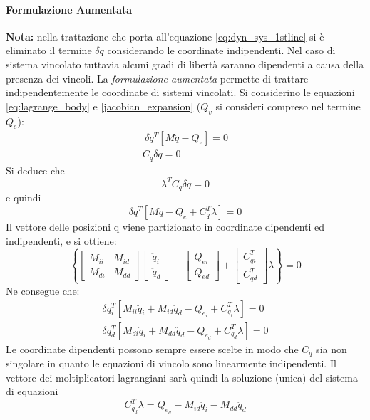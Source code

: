 \paragraph{Formulazione Aumentata}
\textbf{Nota:} nella trattazione che porta all'equazione \ref{eq:dyn_sys_1stline} si è eliminato il termine $\delta q$ considerando le coordinate indipendenti. Nel caso di sistema vincolato tuttavia alcuni gradi di libertà saranno dipendenti a causa della presenza dei vincoli. La \emph{formulazione aumentata} \cite{shabana94} permette di trattare indipendentemente le coordinate di sistemi vincolati. \newline
Si considerino le equazioni \ref{eq:lagrange_body} e \ref{jacobian_expansion} ($Q_v$ si consideri compreso nel termine $Q_e$):
\begin{align} \nonumber \ \delta q^T\left[ M\ddot{q} - Q_e \right] = 0 \\ \nonumber
C_q \delta q = 0
\end{align}
Si deduce che  \[ \lambda^T C_q \delta q = 0 \] e quindi 
\[\delta q^T\left[ M\ddot{q} - Q_e +C_q^T\lambda \right] = 0 \]
Il vettore delle posizioni q viene partizionato in coordinate dipendenti ed indipendenti, e si ottiene:
\begin{equation}  [\delta q_i^T \quad \delta q_d^T] \left\{ \begin{bmatrix} M_{ii} & M_{id} \\ M_{di} & M_{dd}\end{bmatrix}
\begin{bmatrix}\ddot{q}_i \\ \ddot{q}_d \end{bmatrix}
- \begin{bmatrix} Q_{ei} \\ Q_{ed} \end{bmatrix}+ \begin{bmatrix}
C_{qi}^T \\ C_{qd}^T\end{bmatrix} \lambda
\right\}   = 0 \end{equation}
Ne consegue che:
\begin{align} \label{eq_aug_for_a}
\delta q_i^T \left[ M_{ii}\ddot{q}_i + M_{id}\ddot{q}_d - Q_{e_i} + C^T_{q_i}\lambda \right] = 0
\\ \label{eq_aug_for_b}
\delta q_d^T \left[ M_{di}\ddot{q}_i + M_{dd}\ddot{q}_d - Q_{e_d} + C^T_{q_d}\lambda \right] = 0
\end{align}
Le coordinate dipendenti possono sempre essere scelte in modo che $C_q$ sia non singolare in quanto le equazioni di vincolo sono linearmente indipendenti. Il vettore dei moltiplicatori lagrangiani sarà quindi la soluzione (unica) del sistema di equazioni \begin{equation}
C^T_{q_d} \lambda = Q_{e_d} - M_{id}\ddot{q}_i - M_{dd}\ddot{q}_d
\end{equation}
